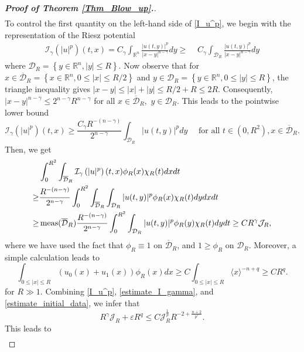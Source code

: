 \documentclass[10pt,a4paper]{amsart}
\begin{document}
\begin{proof}[\textbf{Proof of Theorem \ref{Thm_Blow_up}.}]
\begin{align}
\end{align}
To control the first quantity on the left-hand side of \eqref{I_u^p}, we begin with the representation of the Riesz potential
\begin{align*}
\mathcal{I}_{\gamma}\left(|u|^p\right)(t,x)= C_\gamma\int_{\mathbb{R}^n} \displaystyle\frac{|u(t, y)|^p}{|x-y|^{n-\gamma}} d y
\geq & \,\,C_\gamma\int_{\mathcal{D}_R} \displaystyle\frac{|u(t, y)|^p}{|x-y|^{n-\gamma}} d y
\end{align*}
where $ \mathcal{D}_R=\left\{y \in \mathbb{R}^n, |y| \leq R\right\}$.
Now observe that for $x \in \overline{\mathcal{D}}_R=\left\{x \in \mathbb{R}^n, 0 \leq |x| \leq R/2\right\}$ and $y \in \mathcal{D}_R=\left\{y \in \mathbb{R}^n, 0 \leq |y| \leq R\right\}$, the triangle inequality gives $|x-y| \leq|x|+|y| \leq R/2+R \leq 2 R$. Consequently, $|x-y|^{n-\gamma} \leq 2^{n-\gamma} R^{n-\gamma}$ for all $x \in \overline{\mathcal{D}}_R,\,\, y \in \mathcal{D}_R$. This leads to the pointwise lower bound
$$
\mathcal{I}_{\gamma}\left(|u|^p\right)(t, x) \geq \frac{C_\gamma R^{-(n-\gamma)}}{2^{n-\gamma}} \int_{\mathcal{D}_R}|u(t, y)|^p d y \quad \text { for all } t \in (0, R^2), x \in \overline{\mathcal{D}}_R.
$$
Then, we get
\begin{align} \label{estimate_I_gamma}
&\int_0^{R^2} \int_{\overline{\mathcal{D}}_R} \mathcal{I}_{\gamma}\left(|u|^p\right)(t,x) \phi_R(x)\chi_R(t) d x d t \notag\\
\geq & \frac{R^{-(n-\gamma)}}{2^{n-\gamma}} \int_0^{R^2} \int_{\overline{\mathcal{D}}_R} \int_{\mathcal{D}_R} |u(t, y)|^p \phi_R(x)\chi_R(t) d y d x d t \notag\\
\geq & \operatorname{meas}(\overline{\mathcal{D}}_R) \frac{R^{-(n-\gamma)}}{2^{n-\gamma}} \int_0^{R^2} \int_{\mathcal{D}_R} |u(t, y)|^p \phi_R(y)\chi_R(t) d y d t \geq C R^\gamma \mathcal{J}_R,
\end{align}
where we have used the fact that $\phi_R \equiv 1$ on $\overline{\mathcal{D}}_R$, and $1 \geq \phi_R$ on $\mathcal{D}_R$. Moreover, a simple calculation leads to
\begin{equation} \label{estimate_initial_data}
\int_{0 \leq |x| \leq R}(u_0(x)+u_1(x))\phi_{R}(x)dx \geq C  \int_{0 \leq |x|\leq R}\langle x\rangle^{-n+q} \geq C  R^q.
\end{equation}
for $R\gg1$. Combining \eqref{I_u^p}, \eqref{estimate_I_gamma}, and \eqref{estimate_initial_data}, we infer that $$R^\gamma \mathcal{J}_R+ \varepsilon R^q \leq C \mathcal{J}_R^{\frac{1}{p}}R^{-2+\frac{n+2}{p'}}.$$ This leads to 
\begin{align*}

\end{align*}
\end{proof}
\end{document}
